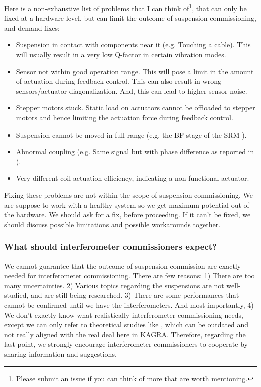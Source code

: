 Here is a non-exhaustive list of problems that I can think of\footnote{Please submit an issue if you can think of more that are worth mentioning.}, that can only be fixed at a hardware level, but can limit the outcome of suspension commissioning, and demand fixes:
\begin{itemize}
	\item Suspension in contact with components near it (e.g. Touching a cable). This will usually result in a very low Q-factor in certain vibration modes.
	\item Sensor not within good operation range. This will pose a limit in the amount of actuation during feedback control. This can also result in wrong sensors/actuator diagonalization. And, this can lead to higher sensor noise.
	\item Stepper motors stuck. Static load on actuators cannot be offloaded to stepper motors and hence limiting the actuation force during feedback control.
	\item Suspension cannot be moved in full range (e.g. the BF stage of the SRM \cite{SRM_work}).
	\item Abnormal coupling (e.g. Same signal but with phase difference as reported in \cite{prequa}).
	\item Very different coil actuation efficiency, indicating a non-functional actuator.
\end{itemize}
Fixing these problems are not within the scope of suspension commissioning.
We are suppose to work with a healthy system so we get maximum potential out of the hardware.
We should ask for a fix, before proceeding.
If it can't be fixed, we should discuss possible limitations and possible workarounds together.

\subsubsection{What should interferometer commissioners expect? \label{sec:what_should_interferometer_commissioners_expect?}}
We cannot guarantee that the outcome of suspension commission are exactly needed for interferometer commissioning.
There are few reasons:
1) There are too many uncertainties.
2) Various topics regarding the suspensions are not well-studied, and are still being researched.
3) There are some performances that cannot be confirmed until we have the interferometers.
And most importantly, 4) We don't exactly know what realistically interferometer commissioning needs, except we can only refer to theoretical studies like \cite{Sekiguchi:2016bmv}, which can be outdated and not really aligned with the real deal here in KAGRA.
Therefore, regarding the last point, we strongly encourage interferometer commissioners to cooperate by sharing information and suggestions.

